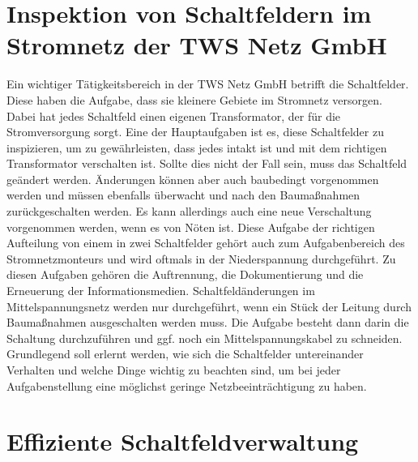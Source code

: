 \section{Inspektion von Schaltfeldern im Stromnetz der TWS Netz GmbH}

Ein wichtiger Tätigkeitsbereich in der TWS Netz GmbH betrifft die Schaltfelder. Diese haben die Aufgabe, dass sie kleinere Gebiete im Stromnetz versorgen. 
Dabei hat jedes Schaltfeld einen eigenen Transformator, der für die Stromversorgung sorgt. Eine der Hauptaufgaben ist es, diese Schaltfelder zu inspizieren, 
um zu gewährleisten, dass jedes intakt ist und mit dem richtigen Transformator verschalten ist. Sollte dies nicht der Fall sein, muss das Schaltfeld geändert 
werden. Änderungen können aber auch baubedingt vorgenommen werden und müssen ebenfalls überwacht und nach den Baumaßnahmen zurückgeschalten werden. Es kann 
allerdings auch eine neue Verschaltung vorgenommen werden, wenn es von Nöten ist. Diese Aufgabe der richtigen Aufteilung von einem in zwei Schaltfelder 
gehört auch zum Aufgabenbereich des Stromnetzmonteurs und wird oftmals in der Niederspannung durchgeführt. Zu diesen Aufgaben gehören \zB die Auftrennung, 
die Dokumentierung und die Erneuerung der Informationsmedien. Schaltfeldänderungen im Mittelspannungsnetz werden nur durchgeführt, wenn ein Stück der 
Leitung durch Baumaßnahmen ausgeschalten werden muss. Die Aufgabe besteht dann darin die Schaltung durchzuführen und ggf. noch ein Mittelspannungskabel zu 
schneiden. Grundlegend soll erlernt werden, wie sich die Schaltfelder untereinander Verhalten und welche Dinge wichtig zu beachten sind, um bei jeder 
Aufgabenstellung eine möglichst geringe Netzbeeinträchtigung zu haben. 
\clearpage

\section{Effiziente Schaltfeldverwaltung}

